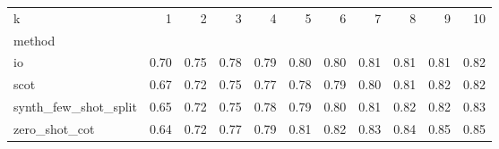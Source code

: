 \begin{tabular}{lrrrrrrrrrr}
\toprule
k & 1 & 2 & 3 & 4 & 5 & 6 & 7 & 8 & 9 & 10 \\
method &  &  &  &  &  &  &  &  &  &  \\
\midrule
io & 0.70 & 0.75 & 0.78 & 0.79 & 0.80 & 0.80 & 0.81 & 0.81 & 0.81 & 0.82 \\
scot & 0.67 & 0.72 & 0.75 & 0.77 & 0.78 & 0.79 & 0.80 & 0.81 & 0.82 & 0.82 \\
synth_few_shot_split & 0.65 & 0.72 & 0.75 & 0.78 & 0.79 & 0.80 & 0.81 & 0.82 & 0.82 & 0.83 \\
zero_shot_cot & 0.64 & 0.72 & 0.77 & 0.79 & 0.81 & 0.82 & 0.83 & 0.84 & 0.85 & 0.85 \\
\bottomrule
\end{tabular}
